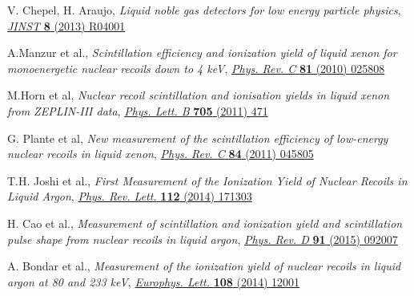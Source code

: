 \documentclass[a4paper,11pt]{article}
\begin{document}
\begin{thebibliography}{99}





V. Chepel, H. Araujo, \emph{Liquid noble gas detectors for low energy particle physics}, \href{http://doi.org/10.1088/1748-0221/8/04/R04001}{\emph{JINST} {\bf 8} (2013) R04001}

A.Manzur et al., \emph{Scintillation efficiency and ionization yield of liquid xenon for monoenergetic nuclear recoils down to 4 keV}, \href{https://doi.org/10.1103/PhysRevC.81.025808}{\emph{Phys. Rev. C} {\bf 81} (2010) 025808}

M.Horn et al, \emph{Nuclear recoil scintillation and ionisation yields in liquid xenon from ZEPLIN-III data}, \href{http://dx.doi.org/10.1016/j.physletb.2011.10.038}{\emph{Phys. Lett. B} {\bf 705} (2011) 471}

G. Plante et al, \emph{New measurement of the scintillation efficiency of low-energy nuclear recoils in liquid xenon}, \href{https://doi.org/10.1103/PhysRevC.84.045805}{\emph{Phys. Rev. C} {\bf 84} (2011) 045805}

T.H. Joshi et al., \emph{First Measurement of the Ionization Yield of Nuclear Recoils in Liquid Argon}, \href{https://doi.org/10.1103/PhysRevLett.112.171303}{\emph{Phys. Rev. Lett.} {\bf 112} (2014) 171303}

H. Cao et al., \emph{Measurement of scintillation and ionization yield and scintillation pulse shape from nuclear recoils in liquid argon}, \href{https://doi.org/10.1103/PhysRevD.91.092007}{\emph{Phys. Rev. D} {\bf 91} (2015) 092007}


A. Bondar et al., \emph{Measurement of the ionization yield of nuclear recoils in liquid argon at 80 and 233 keV}, \href{http://doi.org/10.1209/0295-5075/108/12001}{\emph{Europhys. Lett.} {\bf 108} (2014) 12001}


\end{thebibliography}
\end{document}
